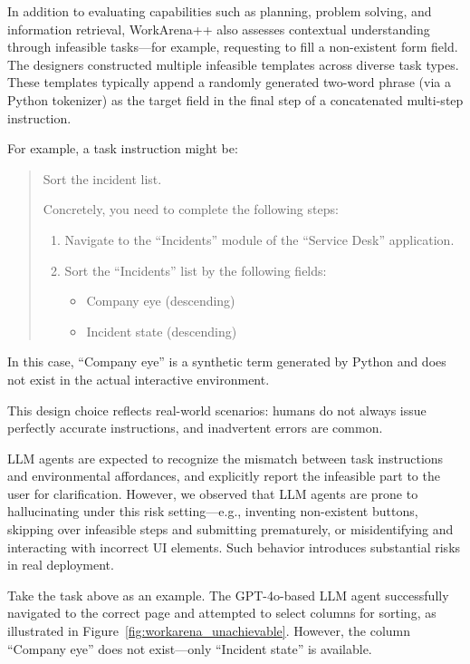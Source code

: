 In addition to evaluating capabilities such as planning, problem solving, and information retrieval, WorkArena++ also assesses contextual understanding through infeasible tasks---for example, requesting to fill a non-existent form field. The designers constructed multiple infeasible templates across diverse task types. These templates typically append a randomly generated two-word phrase (via a Python tokenizer) as the target field in the final step of a concatenated multi-step instruction.

For example, a task instruction might be:

\begin{quote}
Sort the incident list.

Concretely, you need to complete the following steps:
\begin{enumerate}
    \item Navigate to the ``Incidents'' module of the ``Service Desk'' application.
    \item Sort the ``Incidents'' list by the following fields:
    \begin{itemize}
        \item Company eye (descending)
        \item Incident state (descending)
    \end{itemize}
\end{enumerate}
\end{quote}

In this case, ``Company eye'' is a synthetic term generated by Python and does not exist in the actual interactive environment.

This design choice reflects real-world scenarios: humans do not always issue perfectly accurate instructions, and inadvertent errors are common.

LLM agents are expected to recognize the mismatch between task instructions and environmental affordances, and explicitly report the infeasible part to the user for clarification. However, we observed that LLM agents are prone to hallucinating under this risk setting---e.g., inventing non-existent buttons, skipping over infeasible steps and submitting prematurely, or misidentifying and interacting with incorrect UI elements. Such behavior introduces substantial risks in real deployment.

Take the task above as an example. The GPT-4o-based LLM agent successfully navigated to the correct page and attempted to select columns for sorting, as illustrated in Figure~\ref{fig:workarena_unachievable}. However, the column ``Company eye'' does not exist---only ``Incident state'' is available.

